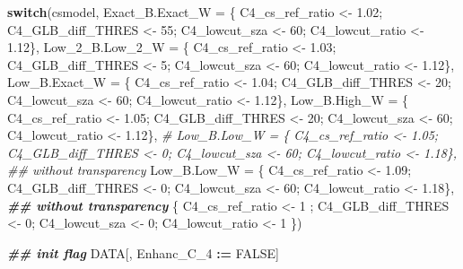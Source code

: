 \documentclass[
  10pt,
  a4paper,oneside]{article}
\newenvironment{Shaded}{\begin{snugshade}}{\end{snugshade}}
\newcommand{\AttributeTok}[1]{\textcolor[rgb]{0.13,0.29,0.53}{#1}}
\newcommand{\CommentTok}[1]{\textcolor[rgb]{0.56,0.35,0.01}{\textit{#1}}}
\newcommand{\ConstantTok}[1]{\textcolor[rgb]{0.56,0.35,0.01}{#1}}
\newcommand{\ControlFlowTok}[1]{\textcolor[rgb]{0.13,0.29,0.53}{\textbf{#1}}}
\newcommand{\DecValTok}[1]{\textcolor[rgb]{0.00,0.00,0.81}{#1}}
\newcommand{\DocumentationTok}[1]{\textcolor[rgb]{0.56,0.35,0.01}{\textbf{\textit{#1}}}}
\newcommand{\FloatTok}[1]{\textcolor[rgb]{0.00,0.00,0.81}{#1}}
\newcommand{\NormalTok}[1]{#1}
\newcommand{\OtherTok}[1]{\textcolor[rgb]{0.56,0.35,0.01}{#1}}
\newcommand{\SpecialCharTok}[1]{\textcolor[rgb]{0.81,0.36,0.00}{\textbf{#1}}}
\begin{document}
\begin{Shaded}
\begin{Highlighting}[]
\ControlFlowTok{switch}\NormalTok{(csmodel,}
       \AttributeTok{Exact\_B.Exact\_W =}\NormalTok{ \{ C4\_cs\_ref\_ratio }\OtherTok{\textless{}{-}} \FloatTok{1.02}\NormalTok{; C4\_GLB\_diff\_THRES }\OtherTok{\textless{}{-}} \DecValTok{55}\NormalTok{; C4\_lowcut\_sza }\OtherTok{\textless{}{-}} \DecValTok{60}\NormalTok{; C4\_lowcut\_ratio }\OtherTok{\textless{}{-}} \FloatTok{1.12}\NormalTok{\},}
       \AttributeTok{Low\_2\_B.Low\_2\_W =}\NormalTok{ \{ C4\_cs\_ref\_ratio }\OtherTok{\textless{}{-}} \FloatTok{1.03}\NormalTok{; C4\_GLB\_diff\_THRES }\OtherTok{\textless{}{-}}  \DecValTok{5}\NormalTok{; C4\_lowcut\_sza }\OtherTok{\textless{}{-}} \DecValTok{60}\NormalTok{; C4\_lowcut\_ratio }\OtherTok{\textless{}{-}} \FloatTok{1.12}\NormalTok{\},}
       \AttributeTok{Low\_B.Exact\_W   =}\NormalTok{ \{ C4\_cs\_ref\_ratio }\OtherTok{\textless{}{-}} \FloatTok{1.04}\NormalTok{; C4\_GLB\_diff\_THRES }\OtherTok{\textless{}{-}} \DecValTok{20}\NormalTok{; C4\_lowcut\_sza }\OtherTok{\textless{}{-}} \DecValTok{60}\NormalTok{; C4\_lowcut\_ratio }\OtherTok{\textless{}{-}} \FloatTok{1.12}\NormalTok{\},}
       \AttributeTok{Low\_B.High\_W    =}\NormalTok{ \{ C4\_cs\_ref\_ratio }\OtherTok{\textless{}{-}} \FloatTok{1.05}\NormalTok{; C4\_GLB\_diff\_THRES }\OtherTok{\textless{}{-}} \DecValTok{20}\NormalTok{; C4\_lowcut\_sza }\OtherTok{\textless{}{-}} \DecValTok{60}\NormalTok{; C4\_lowcut\_ratio }\OtherTok{\textless{}{-}} \FloatTok{1.12}\NormalTok{\},}
       \CommentTok{\# Low\_B.Low\_W     = \{ C4\_cs\_ref\_ratio \textless{}{-} 1.05; C4\_GLB\_diff\_THRES \textless{}{-}  0; C4\_lowcut\_sza \textless{}{-} 60; C4\_lowcut\_ratio \textless{}{-} 1.18\}, \#\# without transparency}
       \AttributeTok{Low\_B.Low\_W     =}\NormalTok{ \{ C4\_cs\_ref\_ratio }\OtherTok{\textless{}{-}} \FloatTok{1.09}\NormalTok{; C4\_GLB\_diff\_THRES }\OtherTok{\textless{}{-}}  \DecValTok{0}\NormalTok{; C4\_lowcut\_sza }\OtherTok{\textless{}{-}} \DecValTok{60}\NormalTok{; C4\_lowcut\_ratio }\OtherTok{\textless{}{-}} \FloatTok{1.18}\NormalTok{\}, }\DocumentationTok{\#\# without transparency}
\NormalTok{                         \{ C4\_cs\_ref\_ratio }\OtherTok{\textless{}{-}} \DecValTok{1}\NormalTok{   ; C4\_GLB\_diff\_THRES }\OtherTok{\textless{}{-}}  \DecValTok{0}\NormalTok{; C4\_lowcut\_sza }\OtherTok{\textless{}{-}}  \DecValTok{0}\NormalTok{; C4\_lowcut\_ratio }\OtherTok{\textless{}{-}} \DecValTok{1}\NormalTok{   \})}


\DocumentationTok{\#\# init flag}
\NormalTok{DATA[, Enhanc\_C\_4 }\SpecialCharTok{:=} \ConstantTok{FALSE}\NormalTok{]}


\end{Highlighting}
\end{Shaded}
\end{document}
